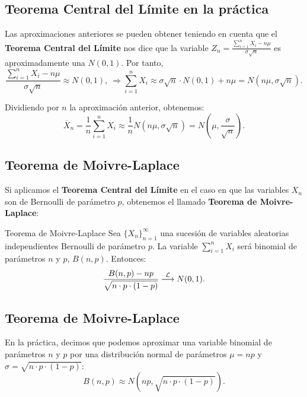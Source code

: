\documentclass[]{book}
\begin{document}
\hypertarget{teorema-central-del-luxedmite-en-la-pruxe1ctica-1}{%
\subsection{Teorema Central del Límite en la práctica}\label{teorema-central-del-luxedmite-en-la-pruxe1ctica-1}}

Las aproximaciones anteriores se pueden obtener teniendo en cuenta que el \textbf{Teorema Central del Límite} nos dice que la variable
\(Z_n= \frac{\sum\limits_{i=1}^n X_i-n\mu}{\sigma\sqrt{n}}\) es aproximadamente una \(N(0,1)\). Por tanto,
\[
\frac{\sum\limits_{i=1}^n X_i-n\mu}{\sigma\sqrt{n}} \approx N(0,1),\ \Rightarrow \sum_{i=1}^n X_i\approx \sigma\sqrt{n}\cdot N(0,1)+n\mu = N\left(n\mu,\sigma\sqrt{n}\right).
\]

Dividiendo por \(n\) la aproximación anterior, obtenemos:
\[
\overline{X}_n =\frac{1}{n}\sum_{i=1}^n X_i \approx \frac{1}{n}N\left(n\mu,\sigma\sqrt{n}\right) =N\left(\mu,\frac{\sigma}{\sqrt{n}}\right).
\]

\hypertarget{teorema-de-moivre-laplace}{%
\subsection{Teorema de Moivre-Laplace}\label{teorema-de-moivre-laplace}}

Si aplicamos el \textbf{Teorema Central del Límite} en el caso en que las variables \(X_n\) son de Bernoulli de parámetro \(p\), obtenemos el llamado \textbf{Teorema de Moivre-Laplace}:

 Teorema de Moivre-Laplace
Sea \(\{X_n\}_{n=1}^\infty\) una sucesión de variables aleatorias independientes Bernoulli de parámetro \(p\). La variable \(\sum\limits_{i=1}^n X_i\) será binomial de parámetros \(n\) y \(p\), \(B(n,p)\). Entonces:
\[
\frac{B(n,p)-np}{\sqrt{n\cdot p\cdot (1-p)}}\stackrel{{\cal L}}{\longrightarrow} N(0,1).
\]

\hypertarget{teorema-de-moivre-laplace-1}{%
\subsection{Teorema de Moivre-Laplace}\label{teorema-de-moivre-laplace-1}}

En la práctica, decimos que podemos aproximar una variable binomial de parámetros \(n\) y \(p\) por una distribución normal de parámetros \(\mu=np\) y \(\sigma =\sqrt{n\cdot p\cdot (1-p)}\):
\[
B(n,p)\approx N(np,\sqrt{n\cdot p\cdot (1-p)}).
\]
\end{document}
